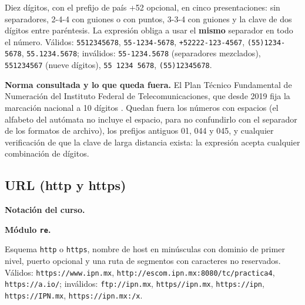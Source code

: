 Diez dígitos, con el prefijo de país +52 opcional, en cinco presentaciones: sin separadores, 2-4-4 con guiones o con puntos, 3-3-4 con guiones y la clave de dos dígitos entre paréntesis. La expresión obliga a usar el \textbf{mismo} separador en todo el número. Válidos: \texttt{5512345678}, \texttt{55-1234-5678}, \texttt{+52222-123-4567}, \texttt{(55)1234-5678}, \texttt{55.1234.5678}; inválidos: \texttt{55-1234.5678} (separadores mezclados), \texttt{551234567} (nueve dígitos), \texttt{55\ 1234\ 5678}, \texttt{(55)12345678}.

\textbf{Norma consultada y lo que queda fuera.} El Plan Técnico Fundamental de Numeración del Instituto Federal de Telecomunicaciones, que desde 2019 fija la marcación nacional a 10 dígitos \autocite{ift2019}. Quedan fuera los números con espacios (el alfabeto del autómata no incluye el espacio, para no confundirlo con el separador de los formatos de archivo), los prefijos antiguos 01, 044 y 045, y cualquier verificación de que la clave de larga distancia exista: la expresión acepta cualquier combinación de dígitos.

\hypertarget{url-http-y-https}{%
\subsection{URL (http y https)}\label{url-http-y-https}}

\textbf{Notación del curso.}

\begin{Shaded}
\begin{Highlighting}[]
\end{Highlighting}
\end{Shaded}

\textbf{Módulo \texttt{re}.}

\begin{Shaded}
\begin{Highlighting}[]
\end{Highlighting}
\end{Shaded}

Esquema \texttt{http} o \texttt{https}, nombre de host en minúsculas con dominio de primer nivel, puerto opcional y una ruta de segmentos con caracteres no reservados. Válidos: \texttt{https://www.ipn.mx}, \texttt{http://escom.ipn.mx:8080/tc/practica4}, \texttt{https://a.io/}; inválidos: \texttt{ftp://ipn.mx}, \texttt{https//ipn.mx}, \texttt{https://ipn}, \texttt{https://IPN.mx}, \texttt{https://ipn.mx:/x}.

